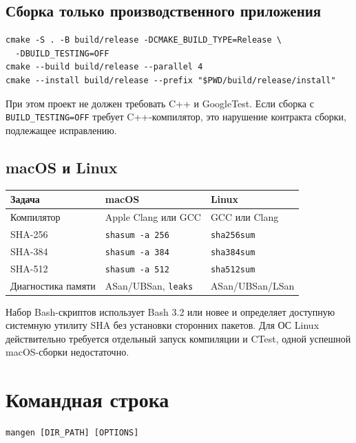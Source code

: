 \documentclass[12pt,a4paper]{article}
\begin{document}
\subsection{Сборка только производственного приложения}

\begin{lstlisting}
cmake -S . -B build/release -DCMAKE_BUILD_TYPE=Release \
  -DBUILD_TESTING=OFF
cmake --build build/release --parallel 4
cmake --install build/release --prefix "$PWD/build/release/install"
\end{lstlisting}

При этом проект не должен требовать C++ и GoogleTest. Если сборка с
\texttt{BUILD\_TESTING=OFF} требует C++-компилятор, это нарушение контракта
сборки, подлежащее исправлению.

\subsection{macOS и Linux}

\begin{tabularx}{\textwidth}{P{0.28\textwidth}YY}
\toprule
Задача & macOS & Linux \\
\midrule
Компилятор & Apple Clang или GCC & GCC или Clang \\
SHA-256 & \texttt{shasum -a 256} & \texttt{sha256sum} \\
SHA-384 & \texttt{shasum -a 384} & \texttt{sha384sum} \\
SHA-512 & \texttt{shasum -a 512} & \texttt{sha512sum} \\
Диагностика памяти & ASan/UBSan, \texttt{leaks} & ASan/UBSan/LSan \\
\bottomrule
\end{tabularx}

Набор Bash-скриптов использует Bash 3.2 или новее и определяет доступную
системную утилиту SHA без установки сторонних пакетов. Для ОС Linux
действительно требуется отдельный запуск компиляции и CTest, одной
успешной macOS-сборки недостаточно.

\section{Командная строка}

\begin{lstlisting}
mangen [DIR_PATH] [OPTIONS]
\end{lstlisting}
\end{document}
